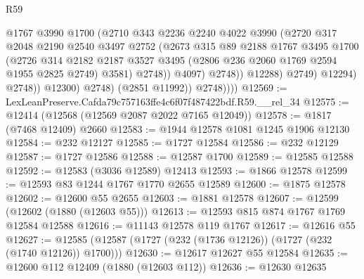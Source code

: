 \begin{lexlean}{R59}
\begin{coremodule}
                                @1767
                                @3990
                                @1700
                                (@2710
                                  @343
                                  @2236
                                  @2240
                                  @4022
                                  @3990
                                  (@2720
                                    @317
                                    @2048
                                    @2190
                                    @2540
                                    @3497
                                    @2752
                                    (@2673
                                      @315
                                      @89
                                      @2188
                                      @1767
                                      @3495
                                      @1700
                                      (@2726
                                        @314
                                        @2182
                                        @2187
                                        @3527
                                        @3495
                                        (@2806 @236 @2060 @1769 @2594 @1955 @2825 @2749)
                                        @3581)
                                      @2748))
                                  @4097)
                                @2748))
                            @12288)
                          @2749)
                        @12294)
                      @2748))
                  @12300)
                @2748)
              (@2851 @11992))
            @2748))))
@12569 := LexLeanPreserve.Cafda79c757163ffe4c6f07f487422bdf.R59.__rel_34
@12575 := @12414 (@12568 (@12569 @2087 @2022 @7165 @12049))
@12578 := @1817 (@7468 @12409) @2660
@12583 := @1944 @12578 @1081 @1245 @1906 @12130
@12584 := @232 @12127
@12585 := @1727 @12584
@12586 := @232 @12129
@12587 := @1727 @12586
@12588 := @12587 @1700
@12589 := @12585 @12588
@12592 := @12583 (@3036 @12589) @12413
@12593 := @1866 @12578
@12599 := @12593 @83 @1244 @1767 @1770 @2655 @12589
@12600 := @1875 @12578
@12602 := @12600 @55 @2655
@12603 := @1881 @12578
@12607 := @12599 (@12602 (@1880 (@12603 @55)))
@12613 := @12593 @815 @874 @1767 @1769 @12584 @12588
@12616 := @11143 @12578 @119 @1767
@12617 := @12616 @55
@12627 := @12585 (@12587 (@1727 (@232 (@1736 @12126)) (@1727 (@232 (@1740 @12126)) @1700)))
@12630 := @12617 @12627 @55 @12584
@12635 := @12600 @112 @12409 (@1880 (@12603 @112))
@12636 := @12630 @12635

\end{coremodule}
\end{lexlean}
